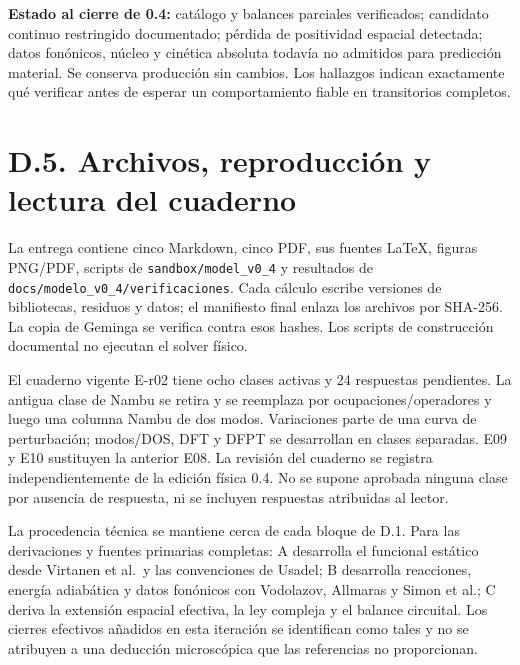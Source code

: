 \documentclass[
  spanish,
  10pt,
  a4paper,
]{article}
\begin{document}
\textbf{Estado al cierre de 0.4:} catálogo y balances parciales
verificados; candidato continuo restringido documentado; pérdida de
positividad espacial detectada; datos fonónicos, núcleo y cinética
absoluta todavía no admitidos para predicción material. Se conserva
producción sin cambios. Los hallazgos indican exactamente qué verificar
antes de esperar un comportamiento fiable en transitorios completos.

\section{D.5. Archivos, reproducción y lectura del
cuaderno}\label{d.5.-archivos-reproducciuxf3n-y-lectura-del-cuaderno}

La entrega contiene cinco Markdown, cinco PDF, sus fuentes LaTeX,
figuras PNG/PDF, scripts de \nolinkurl{sandbox/model_v0_4} y resultados
de \nolinkurl{docs/modelo_v0_4/verificaciones}. Cada cálculo escribe
versiones de bibliotecas, residuos y datos; el manifiesto final enlaza
los archivos por SHA-256. La copia de Geminga se verifica contra esos
hashes. Los scripts de construcción documental no ejecutan el solver
físico.

El cuaderno vigente E-r02 tiene ocho clases activas y 24 respuestas
pendientes. La antigua clase de Nambu se retira y se reemplaza por
ocupaciones/operadores y luego una columna Nambu de dos modos.
Variaciones parte de una curva de perturbación; modos/DOS, DFT y DFPT se
desarrollan en clases separadas. E09 y E10 sustituyen la anterior E08.
La revisión del cuaderno se registra independientemente de la edición
física 0.4. No se supone aprobada ninguna clase por ausencia de
respuesta, ni se incluyen respuestas atribuidas al lector.

La procedencia técnica se mantiene cerca de cada bloque de D.1. Para las
derivaciones y fuentes primarias completas: A desarrolla el funcional
estático desde Virtanen et al.~y las convenciones de Usadel; B
desarrolla reacciones, energía adiabática y datos fonónicos con
Vodolazov, Allmaras y Simon et al.; C deriva la extensión espacial
efectiva, la ley compleja y el balance circuital. Los cierres efectivos
añadidos en esta iteración se identifican como tales y no se atribuyen a
una deducción microscópica que las referencias no proporcionan.
\end{document}

